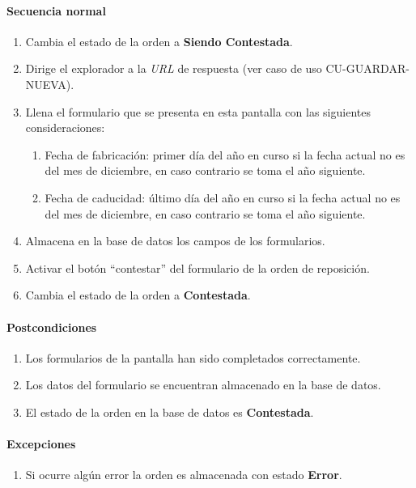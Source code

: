 \paragraph{Secuencia normal}
\begin{enumerate}
  \item Cambia el estado de la orden a \textbf{Siendo Contestada}.
  \item Dirige el explorador a la \textit{URL} de respuesta (ver caso de uso CU-GUARDAR-NUEVA).
  \item Llena el formulario que se presenta en esta pantalla con las siguientes consideraciones:
  \begin{enumerate}
    \item Fecha de fabricación: primer día del año en curso si la fecha actual no es del mes de diciembre, en caso contrario se toma el año siguiente.
    \item Fecha de caducidad: último día del año en curso si la fecha actual no es del mes de diciembre, en caso contrario se toma el año siguiente.
  \end{enumerate}
  \item Almacena en la base de datos los campos de los formularios.
  \item Activar el botón ``contestar'' del formulario de la orden de reposición.
  \item Cambia el estado de la orden a \textbf{Contestada}.
\end{enumerate}
\paragraph{Postcondiciones}
\begin{enumerate}
  \item Los formularios de la pantalla han sido completados correctamente.
  \item Los datos del formulario se encuentran almacenado en la base de datos.
  \item El estado de la orden en la base de datos es \textbf{Contestada}.
\end{enumerate}
\paragraph{Excepciones}
\begin{enumerate}
  \item Si ocurre algún error la orden es almacenada con estado \textbf{Error}.
\end{enumerate}


